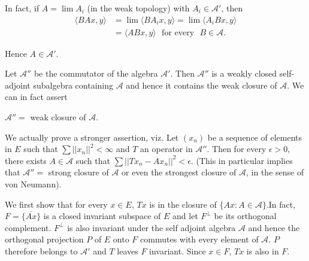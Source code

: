 In fact, if $A = \lim A_i$ (in the weak topology) with
$A_i\in\mathcal{A}'$, then  
\begin{align*}
\langle BAx,y \rangle &= \lim  \langle BA_ix,y \rangle = \lim  \langle
A_iBx,y \rangle\\ 
  & =  \langle ABx,y \rangle \text{~ for every~ } B \in \mathcal{A}.
\end{align*}
 
Hence $A \in \mathcal{A}'$.

Let $\mathcal{A}''$ be the commutator of the algebra
$\mathcal{A}'$. Then $\mathcal{A}''$ is a weakly closed self-adjoint
subalgebra containing $\mathcal{A}$ and hence it contains the weak
closure of $\mathcal{A}$. We can in fact assert 

\begin{thm}\label{partII-chap5-thm2}%
$\mathcal{A}''=$ weak closure of $\mathcal{A}$.
\end{thm}
 
We actually prove a stronger assertion, viz. Let $(x_n)$ be a sequence
of elements in $E$ such that $\sum|| x_n||^{2}< \infty$ and $T$ an
operator in $\mathcal{A}''$. Then for every $\epsilon > 0$, there
exists $A \in\mathcal{A}$ such that $\sum|| Tx_n- Ax_n ||^{2} <
\epsilon$. (This in particular implies that $\mathcal{A}'' =$ strong
closure of $\mathcal{A}$ or even the strongest closure of $\mathcal{A}$, in the
sense of von Neumann).  
 
We first show that for every $x \in E$, $Tx$ is in the closure of
$\{Ax: A \in \mathcal{A}\}$.\pageoriginale In fact, $F =
\overline{\{Ax\}}$ is a closed invariant subspace of $E$ and let
$F^{\perp}$  be its 
orthogonal complement. $F^{\perp}$  is also invariant under the self
adjoint algebra $\mathcal{A}$ and hence the orthogonal projection $P$
of $E$ onto $F$ commutes with every element of $\mathcal{A}$. $P$
therefore belongs to $\mathcal{A}'$ and $T$ leaves $F$
invariant. Since $x \in F$, $Tx$ is also in $F$. 

